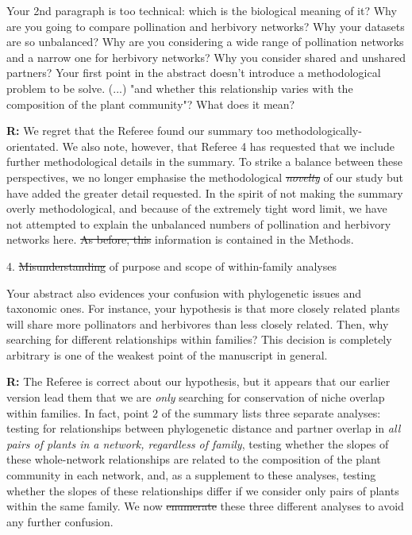 \documentclass[12pt]{letter}
\newenvironment{refquote}{\bigskip \begin{it}}{\end{it}\smallskip}
\providecommand{\DIFadd}[1]{{\protect\color{blue}\uwave{#1}}} %
\providecommand{\DIFdel}[1]{{\protect\color{red}\sout{#1}}}                      %
\providecommand{\DIFaddbegin}{} %
\providecommand{\DIFaddend}{} %
\providecommand{\DIFdelbegin}{} %
\providecommand{\DIFdelend}{} %
\newcommand{\DIFscaledelfig}{0.5}
\newlength{\DIFdelgraphicswidth} %
\newlength{\DIFdelgraphicsheight} %
\newcommand{\DIFaddincludegraphics}[2][]{{\color{blue}\fbox{\DIFOincludegraphics[#1]{#2}}}} %
\newcommand{\DIFdelincludegraphics}[2][]{%
\sbox{\DIFdelgraphicsbox}{\DIFOincludegraphics[#1]{#2}}%
\settoboxwidth{\DIFdelgraphicswidth}{\DIFdelgraphicsbox} %
\settoboxtotalheight{\DIFdelgraphicsheight}{\DIFdelgraphicsbox} %
\scalebox{\DIFscaledelfig}{%
\parbox[b]{\DIFdelgraphicswidth}{\usebox{\DIFdelgraphicsbox}\\[-\baselineskip] \rule{\DIFdelgraphicswidth}{0em}}\llap{\resizebox{\DIFdelgraphicswidth}{\DIFdelgraphicsheight}{%
\setlength{\unitlength}{\DIFdelgraphicswidth}%
\begin{picture}(1,1)%
\thicklines\linethickness{2pt} %
{\color[rgb]{1,0,0}\put(0,0){\framebox(1,1){}}}%
{\color[rgb]{1,0,0}\put(0,0){\line( 1,1){1}}}%
{\color[rgb]{1,0,0}\put(0,1){\line(1,-1){1}}}%
\end{picture}%
}\hspace*{3pt}}} %
} %
\DeclareRobustCommand{\DIFaddbegin}{\DIFOaddbegin \let\includegraphics\DIFaddincludegraphics} %
\DeclareRobustCommand{\DIFaddend}{\DIFOaddend \let\includegraphics\DIFOincludegraphics} %
\DeclareRobustCommand{\DIFdelbegin}{\DIFOdelbegin \let\includegraphics\DIFdelincludegraphics} %
\DeclareRobustCommand{\DIFdelend}{\DIFOaddend \let\includegraphics\DIFOincludegraphics} %
\begin{document}
		\begin{refquote}
			Your 2nd paragraph is too technical: which is the biological meaning of it? Why are you going to compare pollination and herbivory networks? Why your datasets are so unbalanced? Why are you considering a wide range of pollination networks and a narrow one for herbivory networks? Why you consider shared and unshared partners? Your first point in the abstract doesn't introduce a methodological problem to be solve. (...) "and whether this relationship varies with the composition of the plant community"? What does it mean?
		\end{refquote}


		\textbf{R:} We regret that the Referee found our summary too methodologically-orientated. We also note, however, that Referee 4 has requested that we include further methodological details in the summary. To strike a balance between these perspectives, we no longer emphasise the methodological \DIFdelbegin \emph{\DIFdel{novelty}} %
\DIFdelend \DIFaddbegin \DIFadd{novelty }\DIFaddend of our study but have added the greater detail requested. In the spirit of not making the summary overly methodological, and because of the extremely tight word limit, we have not attempted to explain the unbalanced numbers of pollination and herbivory networks here. \DIFdelbegin \DIFdel{As before, this }\DIFdelend \DIFaddbegin \DIFadd{This }\DIFaddend information is contained in the Methods. 


	4. \DIFdelbegin \DIFdel{Misunderstanding }\DIFdelend \DIFaddbegin \DIFadd{Mis-understanding }\DIFaddend of purpose and scope of within-family analyses 

		\begin{refquote}
		Your abstract also evidences your confusion with phylogenetic issues and taxonomic ones. For instance, your hypothesis is that more closely related plants will share more pollinators and herbivores than less closely related. Then, why searching for different relationships within families? This decision is completely arbitrary is one of the weakest point of the manuscript in general.
		\end{refquote}


		\textbf{R:} The Referee is correct about our hypothesis, but it appears that our earlier version lead them that we are \emph{only} searching for conservation of niche overlap within families. In fact, point 2 of the summary lists three separate analyses: testing for relationships between phylogenetic distance and partner overlap in \emph{all pairs of plants in a network, regardless of family}, testing whether the slopes of these whole-network relationships are related to the composition of the plant community in each network, and, as a supplement to these analyses, testing whether the slopes of these relationships differ if we consider only pairs of plants within the same family. We now \DIFdelbegin \DIFdel{enumerate }\DIFdelend \DIFaddbegin \DIFadd{number }\DIFaddend these three different analyses to avoid any further confusion. 
\end{document}
